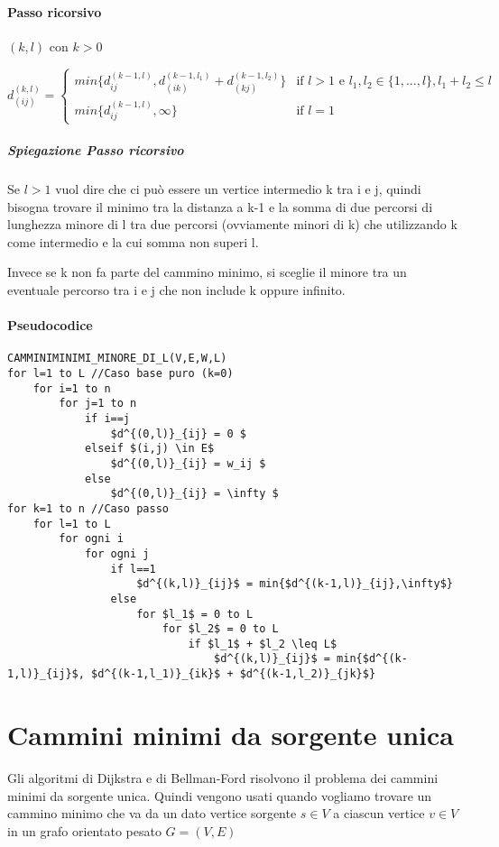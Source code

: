 \documentclass[12pt, a4paper, openany]{book}
\begin{document}
\paragraph{Passo ricorsivo} $(k,l)$ con $k>0$

\begin{equation*}
	d^{(k,l)}_{(ij)} = \begin{cases}
		min\{d^{(k-1,l)}_{ij}, d^{(k-1,l_1)}_{(ik)} + d^{(k-1,l_2)}_{(kj)}  \} & \text{if $l > 1$ e $l_1,l_2\in\{1,...,l\}, l_1+l_2\leq l$ } \\
		min\{d^{(k-1,l)}_{ij}, \infty \}                                       & \text{if $l = 1$}
	\end{cases}
\end{equation*}

\subparagraph*{Spiegazione Passo ricorsivo}
Se $l > 1$ vuol dire che ci può essere un vertice intermedio k tra i e j, quindi bisogna trovare il minimo tra
la distanza a k-1 e la somma di due percorsi di lunghezza minore di l tra due percorsi (ovviamente minori di k) che utilizzando k come intermedio e la
cui somma non superi l.

Invece se k non fa parte del cammino minimo, si sceglie il minore tra un eventuale percorso tra i e j che non include k oppure infinito.

\paragraph{Pseudocodice}

\begin{lstlisting}[mathescape=true]
CAMMINIMINIMI_MINORE_DI_L(V,E,W,L)
for l=1 to L //Caso base puro (k=0)
    for i=1 to n
        for j=1 to n
            if i==j
                $d^{(0,l)}_{ij} = 0 $
            elseif $(i,j) \in E$
                $d^{(0,l)}_{ij} = w_ij $
            else
                $d^{(0,l)}_{ij} = \infty $
for k=1 to n //Caso passo
    for l=1 to L
        for ogni i
            for ogni j
                if l==1
                    $d^{(k,l)}_{ij}$ = min{$d^{(k-1,l)}_{ij},\infty$} 
                else
                    for $l_1$ = 0 to L
                        for $l_2$ = 0 to L
                            if $l_1$ + $l_2 \leq L$
                                $d^{(k,l)}_{ij}$ = min{$d^{(k-1,l)}_{ij}$, $d^{(k-1,l_1)}_{ik}$ + $d^{(k-1,l_2)}_{jk}$} 
\end{lstlisting}

\section{Cammini minimi da sorgente unica}
Gli algoritmi di Dijkstra e di Bellman-Ford risolvono il problema dei cammini minimi da sorgente unica.
Quindi vengono usati quando vogliamo trovare un cammino minimo che va da un dato vertice sorgente $s \in V$ a
ciascun vertice $v \in V$ in un grafo orientato pesato $G = (V, E)$
\end{document}
